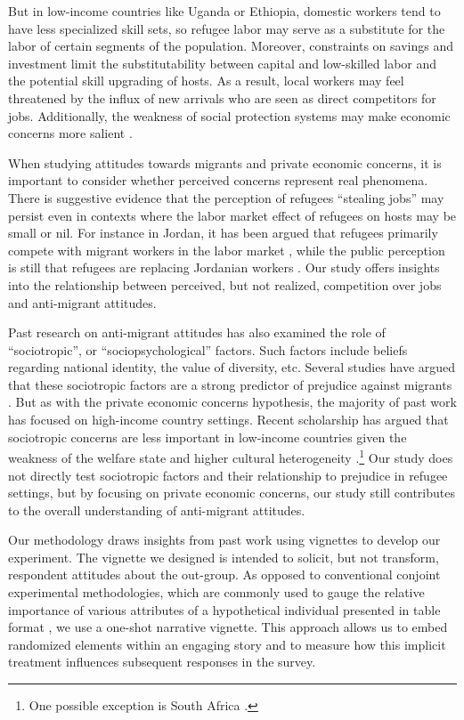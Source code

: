 \documentclass[a4paper,12pt]{article}
\begin{document}
But in low-income countries like Uganda or Ethiopia, domestic workers tend to have less specialized skill sets, so refugee labor may serve as a substitute for the labor of certain segments of the population. Moreover, constraints on savings and investment limit the substitutability between capital and low-skilled labor and the potential skill upgrading of hosts. As a result, local workers may feel threatened by the influx of new arrivals who are seen as direct competitors for jobs. Additionally, the weakness of social protection systems may make economic concerns more salient \citep{alrababa2021attitudes, becker2022}. 

When studying attitudes towards migrants and private economic concerns, it is important to consider whether perceived concerns represent real phenomena. There is suggestive evidence that the perception of refugees ``stealing jobs'' may persist even in contexts where the labor market effect of refugees on hosts may be small or nil. For instance in Jordan, it has been argued that refugees primarily compete with migrant workers in the labor market \citep{fallah2019impact, assaad2019structure}, while the public perception is still that refugees are replacing Jordanian workers \citep{baylouny2020}. Our study offers insights into the relationship between perceived, but not realized, competition over jobs and anti-migrant attitudes.  

Past research on anti-migrant attitudes has also examined the role of ``sociotropic'', or ``sociopsychological'' factors. Such factors include beliefs regarding national identity, the value of diversity, etc. Several studies have argued that these sociotropic factors are a strong predictor of prejudice against migrants \citep{hainmueller2014public, card2012immigration, valentino2019}. But as with the private economic concerns hypothesis, the majority of past work has focused on high-income country settings. Recent scholarship has argued that sociotropic concerns are less important in low-income countries given the weakness of the welfare state and higher cultural heterogeneity \citep{alrababa2021attitudes, becker2022}.\footnote{One possible exception is South Africa \citep{facchini2013}.} Our study does not directly test sociotropic factors and their relationship to prejudice in refugee settings, but by focusing on private economic concerns, our study still contributes to the overall understanding of anti-migrant attitudes. 

Our methodology draws insights from past work using vignettes to develop our experiment. The vignette we designed is intended to solicit, but not transform, respondent attitudes about the out-group. As opposed to conventional conjoint experimental methodologies, which are commonly used to gauge the relative importance of various attributes of a hypothetical individual presented in table format \citep{alrababa2021attitudes, hainmueller2014causal, becker2022}, we use a one-shot narrative vignette.  This approach allows us to embed randomized elements within an engaging story and to measure how this implicit treatment influences subsequent responses in the survey. 
\end{document}

